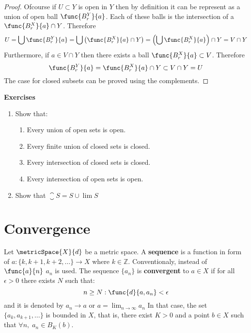 \begin{proof}
    Ofcourse if \(U \subset Y\) is open in \(Y\) then by definition it can be represent as a union of open ball \(\func{B_r^Y}{a} \). Each of these balls is the intersection of a \(\func{B_r^X}{a} \cap Y\). Therefore
    \begin{equation*}
        U = \bigcup \func{B_r^Y}{a} = \bigcup \left(\func{B_r^X}{a} \cap Y\right) = \left( \bigcup \func{B_r^X}{a} \right) \cap Y = V \cap Y
    \end{equation*}
    Furthermore, if \(a \in V \cap Y\) then there exists a ball \(\func{B_r^X}{a} \subset V\). Therefore
    \begin{equation*}
        \func{B_r^Y}{a} = \func{B_r^X}{a} \cap Y \subset V \cap Y = U
    \end{equation*}
    The case for closed subsets can be proved using the complements.
\end{proof}

{\Large\textbf{Exercises}}
\begin{enumerate}
    \item Show that:
          \begin{enumerate}
              \item Every union of open sets is open.
              \item Every finite union of closed sets is closed.
              \item Every intersection of closed sets is closed.
              \item Every intersection of open sets is open.
          \end{enumerate}
    \item Show that \(\closure S = S \cup \lim S\)
\end{enumerate}
\newpage

\section{Convergence}
Let \(\metricSpace{X}{d}\) be a metric space. A \textbf{sequence} is a function in form of \({ a : \{ k, k+1, k+2, \dots \} \to X}\) where \(k \in \mathbb{Z} \). Conventionaly, instead of \(\func{a}{n}\) \(a_n\) is used. The sequence \(\{ a_n\}\) is \textbf{convergent} to \(a \in X\) if for all \(\epsilon > 0\) there exists \(N\) such that:
\[ n \geq N : \func{d}{a,a_n} < \epsilon\]
and it is denoted by \(a_n \to a\) or \(\displaystyle{a = \lim_{n \to \infty}{a_n}}\)
In that case, the set \(\{ a_k, a_{k + 1} , \dots \}\) is bounded in \(X\), that is, there exist \(K > 0\) and a point \(b \in X\) such that \(\forall n,\; a_n \in B_K(b)\).

